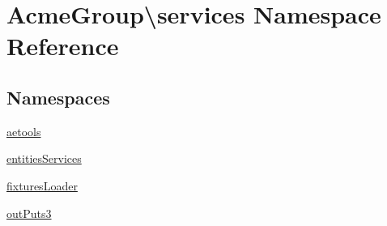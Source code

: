 \hypertarget{namespace_acme_group_1_1services}{\section{Acme\+Group\textbackslash{}services Namespace Reference}
\label{namespace_acme_group_1_1services}
}
\subsection*{Namespaces}
\begin{DoxyCompactItemize}
\item 
 \hyperlink{namespace_acme_group_1_1services_1_1aetools}{aetools}
\item 
 \hyperlink{namespace_acme_group_1_1services_1_1entities_services}{entities\+Services}
\item 
 \hyperlink{namespace_acme_group_1_1services_1_1fixtures_loader}{fixtures\+Loader}
\item 
 \hyperlink{namespace_acme_group_1_1services_1_1out_puts3}{out\+Puts3}
\end{DoxyCompactItemize}
